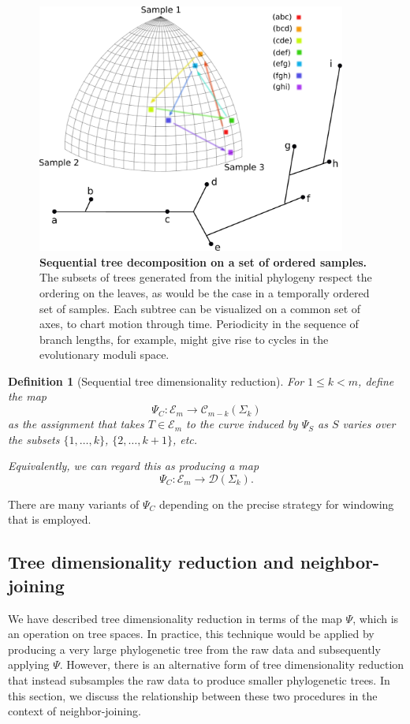 \documentclass[a4paper,11pt]{article}
\newtheorem{definition}[theorem]{Definition}
\newcommand{\aC}{\mathcal{C}}
\newcommand{\aD}{\mathcal{D}}
\newcommand{\aE}{\mathcal{E}}
\begin{document}
\begin{figure}
    \centering
    \includegraphics[width=4in]{../figures/dimred_def4.pdf}
    \caption{{\bf Sequential tree decomposition on a set of ordered samples.} The subsets of trees generated from the initial phylogeny respect the ordering on the leaves, as would be the case in a temporally ordered set of samples. Each subtree can be visualized on a common set of axes, to chart motion through time. Periodicity in the sequence of branch lengths, for example, might give rise to cycles in the evolutionary moduli space.}
    \label{fig:dimred_def4}
\end{figure} 

\begin{definition}[Sequential tree dimensionality reduction]
For $1 \leq k < m$, define the map
\[
\Psi_C \colon \aE_m \to \aC_{m-k}(\Sigma_k)
\]
as the assignment that takes $T \in \aE_m$ to the curve induced by $\Psi_S$ as $S$ varies over the subsets $\{1, \ldots, k\}$, $\{2, \ldots, k+1\}$, etc.

Equivalently, we can regard this as producing a map
\[
\Psi_C \colon \aE_m \to \aD(\Sigma_k).
\]
\end{definition}

There are many variants of $\Psi_C$ depending on the precise strategy for windowing that is employed.

\subsection{Tree dimensionality reduction and neighbor-joining}

We have described tree dimensionality reduction in terms of the map $\Psi$, which is an operation on tree spaces.
In practice, this technique would be applied by producing a very large phylogenetic tree from the raw data and subsequently applying $\Psi$.
However, there is an alternative form of tree dimensionality reduction that instead subsamples the raw data to produce smaller phylogenetic trees.
In this section, we discuss the relationship between these two procedures in the context of neighbor-joining.
\end{document}
